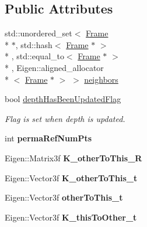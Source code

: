 \subsection*{Public Attributes}
\begin{DoxyCompactItemize}
\item 
std\-::unordered\-\_\-set$<$ \hyperlink{classlsd__slam_1_1_frame}{Frame} \\*
$\ast$, std\-::hash$<$ \hyperlink{classlsd__slam_1_1_frame}{Frame} $\ast$ $>$\\*
, std\-::equal\-\_\-to$<$ \hyperlink{classlsd__slam_1_1_frame}{Frame} $\ast$ $>$\\*
, Eigen\-::aligned\-\_\-allocator\\*
$<$ \hyperlink{classlsd__slam_1_1_frame}{Frame} $\ast$ $>$ $>$ \hyperlink{classlsd__slam_1_1_frame_ac0beb1665cd6caecfef8f6103203c147}{neighbors}
\item 
bool \hyperlink{classlsd__slam_1_1_frame_a2447e3447316b2803b20542e70e10785}{depth\-Has\-Been\-Updated\-Flag}
\begin{DoxyCompactList}\small\item\em Flag is set when depth is updated. \end{DoxyCompactList}\item 
\hypertarget{classlsd__slam_1_1_frame_ae2968ee29976f194c3c8c552f7ebf3b7}{int {\bfseries perma\-Ref\-Num\-Pts}}\label{classlsd__slam_1_1_frame_ae2968ee29976f194c3c8c552f7ebf3b7}

\item 
\hypertarget{classlsd__slam_1_1_frame_aa5422a17806f94238eb4b0a997f84d3c}{Eigen\-::\-Matrix3f {\bfseries K\-\_\-other\-To\-This\-\_\-\-R}}\label{classlsd__slam_1_1_frame_aa5422a17806f94238eb4b0a997f84d3c}

\item 
\hypertarget{classlsd__slam_1_1_frame_a299bcddaca0539b927cc0e3a6ec5739b}{Eigen\-::\-Vector3f {\bfseries K\-\_\-other\-To\-This\-\_\-t}}\label{classlsd__slam_1_1_frame_a299bcddaca0539b927cc0e3a6ec5739b}

\item 
\hypertarget{classlsd__slam_1_1_frame_ac60ac357b2988ee6ae78cc0ea9030d77}{Eigen\-::\-Vector3f {\bfseries other\-To\-This\-\_\-t}}\label{classlsd__slam_1_1_frame_ac60ac357b2988ee6ae78cc0ea9030d77}

\item 
\hypertarget{classlsd__slam_1_1_frame_ae67bd56784580e5bba78c78c54c79513}{Eigen\-::\-Vector3f {\bfseries K\-\_\-this\-To\-Other\-\_\-t}}\label{classlsd__slam_1_1_frame_ae67bd56784580e5bba78c78c54c79513}


\end{DoxyCompactItemize}
